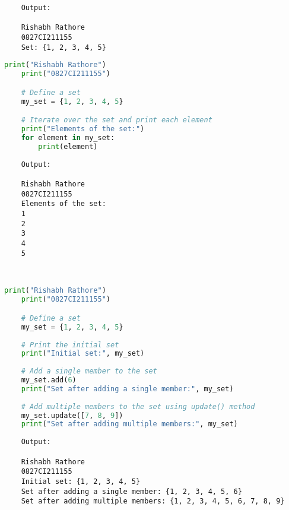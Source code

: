 \documentclass{report}
\begin{document}
\begin{verbatim}
	Output:

	Rishabh Rathore
	0827CI211155
	Set: {1, 2, 3, 4, 5}

\end{verbatim}

\newpage


\sol 
\begin{lstlisting}[language=Python]
	print("Rishabh Rathore")
	print("0827CI211155")

	# Define a set
	my_set = {1, 2, 3, 4, 5}

	# Iterate over the set and print each element
	print("Elements of the set:")
	for element in my_set:
		print(element)
\end{lstlisting}

\begin{verbatim}
	Output:

	Rishabh Rathore
	0827CI211155
	Elements of the set:
	1
	2
	3
	4
	5
	
	
\end{verbatim}

\newpage


\sol 
\begin{lstlisting}[language=Python]
	print("Rishabh Rathore")
	print("0827CI211155")

	# Define a set
	my_set = {1, 2, 3, 4, 5}
	
	# Print the initial set
	print("Initial set:", my_set)
	
	# Add a single member to the set
	my_set.add(6)
	print("Set after adding a single member:", my_set)
	
	# Add multiple members to the set using update() method
	my_set.update([7, 8, 9])
	print("Set after adding multiple members:", my_set)
\end{lstlisting}

\begin{verbatim}
	Output:

	Rishabh Rathore
	0827CI211155
	Initial set: {1, 2, 3, 4, 5}
	Set after adding a single member: {1, 2, 3, 4, 5, 6}
	Set after adding multiple members: {1, 2, 3, 4, 5, 6, 7, 8, 9}

	

\end{verbatim}

\newpage
\end{document}
